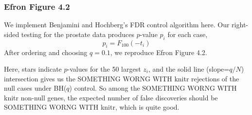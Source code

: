 \documentclass{article}
\newcommand{\rinline}[1]{SOMETHING WORNG WITH knitr}
\begin{document}
\subsubsection*{Efron Figure 4.2}
\hspace{12 pt} We implement Benjamini and Hochberg's FDR control
algorithm here. Our right-sided testing for the prostate data
produces $p$-value $p_i$ for each case, 
\begin{displaymath}
p_i = F_{100}(-t_i)
\end{displaymath}
After ordering and choosing $q=0.1$, we reproduce Efron Figure 4.2. 


Here, stars indicate $p$-values for the 50 largest $z_i$, and the
solid line (slope=$q/N$) intersection gives us the \rinline{R}
rejections of the null cases under BH($q$) control. So among the
\rinline{R} non-null genes, the expected number of 
false discoveries should be \rinline{q*R}, which is quite good.
\end{document}
